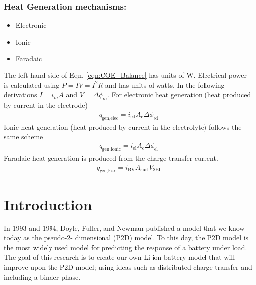 \documentclass[12pt]{article}
\begin{document}
		\subsubsection{Heat Generation mechanisms:}
		\begin{itemize}
			\item Electronic
			\item Ionic
			\item Faradaic 
		\end{itemize}
		The left-hand side of Eqn. \ref{eqn:COE_Balance} has units of 
		W. 
		Electrical power is calculated using $P=IV=I^2R$ and has units of watts.
		In the following derivations $I = i_m A$ and $V = \Delta \phi_m$.
		For electronic heat generation (heat produced by current in the electrode)
		\begin{gather}
			\dot{q}_\text{gen,elec} = i_\text{ed} A_\text{c} \Delta \phi_\text{ed} %
		\end{gather}
		Ionic heat generation (heat produced by current in the electrolyte) follows the same scheme			
		\begin{gather}
			\dot{q}_\text{gen,ionic} = i_\text{el} A_\text{c} \Delta \phi_\text{el} 
		\end{gather}
		Faradaic heat generation is produced from the charge transfer current.
		\begin{gather}
			\dot{q}_\text{gen,Far} = i_\text{BV} A_\text{surf} V_\text{SEI} 
		\end{gather}			
		
\section{Introduction}
	In 1993 and 1994, Doyle, Fuller, and Newman \cite{DFN93,FDN94} published a model that we know today as the pseudo-2- dimensional (P2D) model. To this day, the P2D model is the most widely used model for predicting the response of a battery under load. The goal of this research is to create our own Li-ion battery model that will improve upon the P2D model; using ideas such as distributed charge transfer and including a binder phase. 
\end{document}
